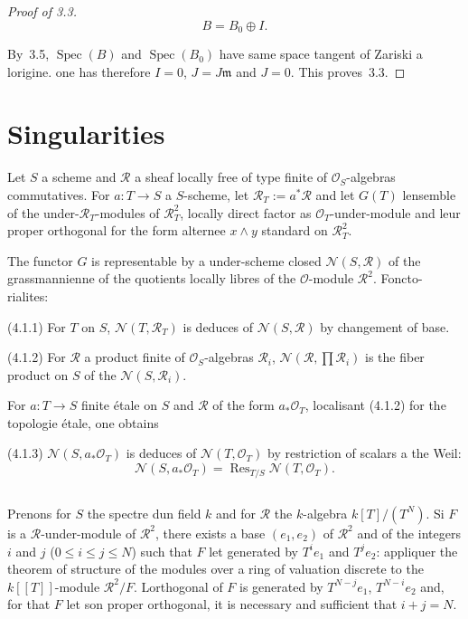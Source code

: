 \documentclass[11pt,a4paper]{article}
\theoremstyle{plain}
\theoremstyle{definition}
\DeclareMathOperator{\Spec}{Spec}
\DeclareMathOperator{\Res}{Res}
\begin{document}
\begin{proof}[Proof of 3.3]
\begin{equation}
B = B_0 \oplus I.
\end{equation}

By~3.5, $\Spec(B)$ and $\Spec(B_0)$ have same space tangent of Zariski a lorigine. one has therefore $I = 0$, $J = J\mathfrak{m}$ and $J = 0$. This proves~3.3.
\end{proof}

\section{Singularities}

Let $S$ a scheme and $\mathscr{R}$ a sheaf locally free of type finite of $\mathscr{O}_S$-algebras
commutatives. For $a: T \to S$ a $S$-scheme, let $\mathscr{R}_T := a^*\mathscr{R}$ and let $G(T)$
lensemble of the under-$\mathscr{R}_T$-modules of $\mathscr{R}_T^2$, locally direct factor as
$\mathscr{O}_T$-under-module and leur proper orthogonal for the form alternee $x \wedge y$
standard on $\mathscr{R}_T^2$.

The functor $G$ is representable by a under-scheme closed $\mathscr{N}(S, \mathscr{R})$ of the
grassmannienne of the quotients locally libres of the $\mathscr{O}$-module $\mathscr{R}^2$. Foncto-
rialites:

(4.1.1) For $T$ on $S$, $\mathscr{N}(T, \mathscr{R}_T)$ is deduces of $\mathscr{N}(S, \mathscr{R})$ by changement of base.

(4.1.2) For $\mathscr{R}$ a product finite of $\mathscr{O}_S$-algebras $\mathscr{R}_i$, $\mathscr{N}(\mathscr{R}, \prod \mathscr{R}_i)$ is the fiber product
on $S$ of the $\mathscr{N}(S, \mathscr{R}_i)$.

For $a: T \to S$ finite étale on $S$ and $\mathscr{R}$ of the form $a_*\mathscr{O}_T$, localisant (4.1.2) for
the topologie étale, one obtains

(4.1.3) $\mathscr{N}(S, a_*\mathscr{O}_T)$ is deduces of $\mathscr{N}(T, \mathscr{O}_T)$ by restriction of scalars a the
Weil:
\begin{equation}
\mathscr{N}(S, a_*\mathscr{O}_T) = \Res_{T/S} \mathscr{N}(T, \mathscr{O}_T).
\end{equation}

\subsection{}

Prenons for $S$ the spectre dun field $k$ and for $\mathscr{R}$ the $k$-algebra $k[T]/(T^N)$. Si
$F$ is a $\mathscr{R}$-under-module of $\mathscr{R}^2$, there exists a base $(e_1, e_2)$ of $\mathscr{R}^2$ and of the integers $i$
and $j$ ($0 \leq i \leq j \leq N$) such that $F$ let generated by $T^i e_1$ and $T^j e_2$: appliquer the
theorem of structure of the modules over a ring of valuation discrete to the
$k[[T]]$-module $\mathscr{R}^2/F$. Lorthogonal of $F$ is generated by $T^{N-j} e_1$, $T^{N-i} e_2$ and,
for that $F$ let son proper orthogonal, it is necessary and sufficient that $i + j = N$.
\end{document}
